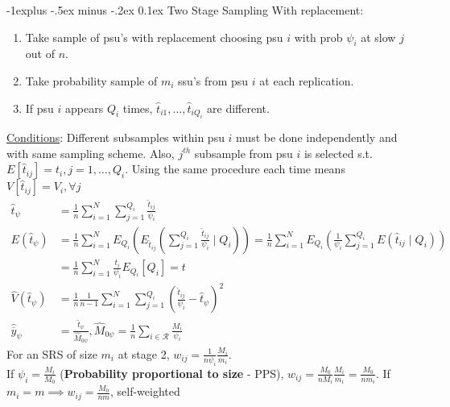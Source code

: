 \documentclass[landscape]{article}
\makeatletter
\renewcommand{\subsection}{\@startsection{subsection}{2}{0mm}%
                                {-1explus -.5ex minus -.2ex}%
                                {0.1ex}%
                                {\color{orange}\normalfont\normalsize\bfseries}}
\makeatother
\begin{document}
\begin{multicols*}{3}
\subsection{Two Stage Sampling}
With replacement:
\begin{enumerate}
\item Take sample of psu's with replacement choosing psu $i$ with prob
  $\psi_i$ at slow $j$ out of $n$.
\item Take probability sample of $m_i$ ssu's from psu $i$ at each
  replication.
\item If psu $i$ appears $Q_i$ times, $\hat{t}_{i1}, \ldots,
  \hat{t}_{iQ_i}$ are different.
\end{enumerate}
\underline{Conditions}: Different subsamples within psu $i$ must be done
independently and with same sampling scheme. Also, $j^{th}$ subsample
from psu $i$ is selected s.t.\ $E[\hat{t}_{ij}] = t_i, j = 1, \ldots, Q_i$. Using the same
procedure each time means $V[\hat{t}_{ij}] = V_i, \forall j$
\begin{align*}
  \hat{t}_{\psi} & = \frac{1}{n} \sum_{i=1}^N \sum_{j=1}^{Q_i} \frac{\hat{t}_{ij}}{\psi_i}
  \\ E (\hat{t}_{\psi}) &
                          = \frac{1}{n} \sum_{i=1}^N E_{Q_i} \left(E_{\hat{t}_{ij}} \left(\sum_{j=1}^{Q_i}\frac{\hat{t}_{ij}}{\psi_i} \mid Q_i\right)\right)
                          = \frac{1}{n} \sum_{i=1}^N E_{Q_i} \left( \frac{1}{\psi_i} \sum_{j=1}^{Q_i} E \left({\hat{t}_{ij}} \mid Q_i\right)\right)
  \\ &   = \frac{1}{n} \sum_{i=1}^N \frac{t_i}{\psi_i} E_{Q_i} [Q_i] = t
  \\ \hat{V}(\hat{t}_{\psi}) & = \frac{1}{n} \frac{1}{n-1} \sum_{i=1}^N \sum_{j = 1}^{Q_i} \left(\frac{{\hat{t}}_{ij}}{\psi_i} - \hat{t}_{\psi}\right)^2
  \\ \hat{\overline{y}}_{\psi} & = \frac{\hat{t}_{\psi}}{\hat{M}_{0\psi}}, \hat{M}_{0\psi} = \frac{1}{n} \sum_{i \in \mathcal{R}} \frac{M_i}{\psi_i}
\end{align*}
For an SRS of size $m_i$ at stage 2, $w_{ij} = \frac{1}{n \psi_i}
\frac{M_i}{m_i}$.
\\ If $\psi_i = \frac{M_i}{M_0}$ (\textbf{Probability proportional to
  size} - PPS), $w_{ij} = \frac{M_0}{n M_i} \frac{M_i}{m_i} =
\frac{M_0}{n m_i}$. If $m_i = m \implies w_{ij} = \frac{M_0}{nm}$,
self-weighted

\end{multicols*}
\end{document}
